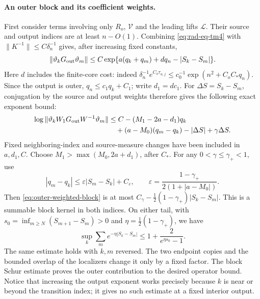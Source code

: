 \paragraph{An outer block and its coefficient weights.}
First consider terms involving only $R_o$, $\mathcal V$ and the leading
lifts $\mathcal L$.  Their source and output indices are at least
$n-O(1)$.  Combining \eqref{eq:rad-eq-tm4} with
$\|K^{-1}\|\le C\delta_n^{-1}$ gives, after increasing fixed constants,
\[
 \|\vartheta_kG_{\rm out}\vartheta_m\|
 \le C\exp\{a(q_k+q_m)+d q_n-|S_k-S_m|\}.
\]
Here $d$ includes the finite-core cost: indeed
$\delta_n^{-1}e^{C_o\tau_{n,j}}
 \le c_0^{-1}\exp(n^2+C_oC_*q_n)$.
Since the output is outer, $q_n\le c_1q_k+C_1$; write $d_1=dc_1$.
For $\Delta S=S_k-S_m$, conjugation by the source and output weights
therefore gives the following exact exponent bound:
\begin{equation}\label{eq:outer-weighted-block}
 \begin{aligned}
 \log\|\vartheta_kW_1G_{\rm out}W^{-1}\vartheta_m\|
 &\le C-(M_1-2a-d_1)q_k\\
 &\quad +(a-M_0)(q_m-q_k)-|\Delta S|+\gamma\Delta S.
 \end{aligned}
\end{equation}
Fixed neighboring-index and source-measure changes have been included
in $a,d_1,C$.  Choose $M_1>\max(M_0,2a+d_1)$, after $C_*$.
For any $0<\gamma\le\gamma_+<1$, use
\[
 |q_m-q_k|\le\varepsilon|S_m-S_k|+C_\varepsilon,
 \qquad
 \varepsilon=\frac{1-\gamma_+}{2(1+|a-M_0|)}.
\]
Then \eqref{eq:outer-weighted-block} is at most
$C_\gamma-\tfrac12(1-\gamma_+)|S_k-S_m|$.
This is a summable block kernel in both indices.  On either tail, with
$s_0=\inf_{m\ge N}(S_{m+1}-S_m)>0$ and
$\eta=\tfrac12(1-\gamma_+)$, we have
\[
 \sup_k\sum_m e^{-\eta|S_k-S_m|}
 \le1+\frac{2}{e^{\eta s_0}-1}.
\]
The same estimate holds with $k,m$ reversed.  The two endpoint copies
and the bounded overlap of the localizers change it only by a fixed
factor.  The block Schur estimate proves the outer contribution to the
desired operator bound.
Notice that increasing the output exponent works precisely because
$k$ is near or beyond the transition index; it gives no such estimate
at a fixed interior output.

